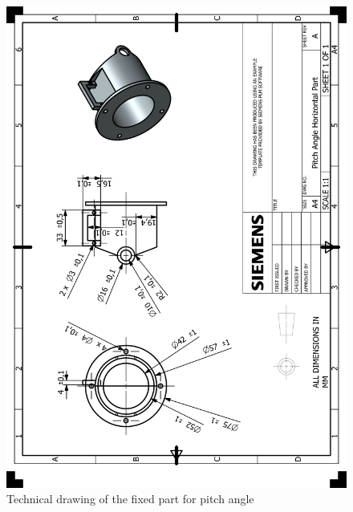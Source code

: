 \documentclass[12pt]{article}
\begin{document}
\begin{appendices}
\begin{figure}[H]
    \centering
    \includegraphics[width=\textwidth]{HP_Pitch Angle Horizontal Part.png} 
    \caption{Technical drawing of the fixed part for pitch angle}
    \label{fig:technical-drawing}
\end{figure}


\end{appendices}
\end{document}
